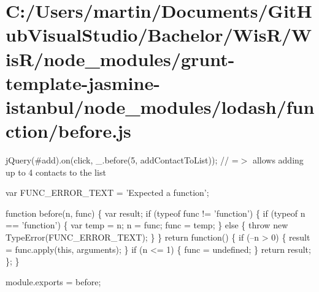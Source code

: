 \hypertarget{_c_1_2_users_2martin_2_documents_2_git_hub_visual_studio_2_bachelor_2_wis_r_2_wis_r_2node_module94f9e848c772dbf3794dccf4a19dab5d}{}\section{C\+:/\+Users/martin/\+Documents/\+Git\+Hub\+Visual\+Studio/\+Bachelor/\+Wis\+R/\+Wis\+R/node\+\_\+modules/grunt-\/template-\/jasmine-\/istanbul/node\+\_\+modules/lodash/function/before.\+js}
j\+Query(\textquotesingle{}\#add\textquotesingle{}).on(\textquotesingle{}click\textquotesingle{}, \+\_\+.\+before(5, add\+Contact\+To\+List)); // =$>$ allows adding up to 4 contacts to the list


\begin{DoxyCodeInclude}

var FUNC\_ERROR\_TEXT = \textcolor{stringliteral}{'Expected a function'};

\textcolor{keyword}{function} before(n, func) \{
  var result;
  \textcolor{keywordflow}{if} (typeof func != \textcolor{stringliteral}{'function'}) \{
    \textcolor{keywordflow}{if} (typeof n == \textcolor{stringliteral}{'function'}) \{
      var temp = n;
      n = func;
      func = temp;
    \} \textcolor{keywordflow}{else} \{
      \textcolor{keywordflow}{throw} \textcolor{keyword}{new} TypeError(FUNC\_ERROR\_TEXT);
    \}
  \}
  \textcolor{keywordflow}{return} \textcolor{keyword}{function}() \{
    \textcolor{keywordflow}{if} (--n > 0) \{
      result = func.apply(\textcolor{keyword}{this}, arguments);
    \}
    \textcolor{keywordflow}{if} (n <= 1) \{
      func = undefined;
    \}
    \textcolor{keywordflow}{return} result;
  \};
\}

module.exports = before;
\end{DoxyCodeInclude}
 